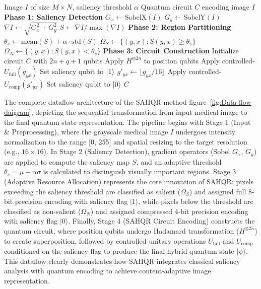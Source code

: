 \documentclass[pdflatex,sn-mathphys-num,Numbered]{sn-jnl}
\theoremstyle{thmstyleone}
\theoremstyle{thmstyletwo}
\theoremstyle{thmstylethree}
\begin{document}
\begin{algorithm}
\caption{SAHQR: Saliency-Aware Hybrid Quantum Image Representation}\label{alg:sahqr}
\begin{algorithmic}[1]
\Require Image $I$ of size $M \times N$, saliency threshold $\alpha$
\Ensure Quantum circuit $C$ encoding image $I$
\State \textbf{Phase 1: Saliency Detection}
\State $G_x \gets \text{SobelX}(I)$ 
\State $G_y \gets \text{SobelY}(I)$ 
\State $\nabla I \gets \sqrt{G_x^2 + G_y^2}$ 
\State $S \gets \nabla I / \max(\nabla I)$ 
\State
\State \textbf{Phase 2: Region Partitioning}
\State $\theta_s \gets \text{mean}(S) + \alpha \cdot \text{std}(S)$ 
\State $\Omega_S \gets \{(y,x) : S(y,x) \geq \theta_s\}$ 
\State $\Omega_N \gets \{(y,x) : S(y,x) < \theta_s\}$ 
\State
\State \textbf{Phase 3: Circuit Construction}
\State Initialize circuit $C$ with $2n + q + 1$ qubits
\State Apply $H^{\otimes 2n}$ to position qubits 
\State
{}
    \State Apply controlled-$U_{\text{full}}(g_{yx})$ 
    \State Set saliency qubit to $\ket{1}$
\EndFor
\State
{}
    \State $g'_{yx} \gets \lfloor g_{yx} / 16 \rfloor$ 
    \State Apply controlled-$U_{\text{comp}}(g'_{yx})$ 
    \State Set saliency qubit to $\ket{0}$
\EndFor
\State
\State \Return $C$
\end{algorithmic}
\end{algorithm}

The complete dataflow architecture of the SAHQR method figure~\ref{fig:Data flow daigram}, depicting the sequential transformation from input medical image to the final quantum state representation. The pipeline begins with Stage 1 (Input & Preprocessing), where the grayscale medical image $I$ undergoes intensity normalization to the range [0, 255] and spatial resizing to the target resolution (e.g., $16 \times 16$). In Stage 2 (Saliency Detection), gradient operators (Sobel $G_x$, $G_y$) are applied to compute the saliency map $S$, and an adaptive threshold $\theta_s = \mu + \alpha\sigma$ is calculated to distinguish visually important regions. Stage 3 (Adaptive Resource Allocation) represents the core innovation of SAHQR: pixels exceeding the saliency threshold are classified as salient ($\Omega_S$) and assigned full 8-bit precision encoding with saliency flag $|1\rangle$, while pixels below the threshold are classified as non-salient ($\Omega_N$) and assigned compressed 4-bit precision encoding with saliency flag $|0\rangle$. Finally, Stage 4 (SAHQR Circuit Encoding) constructs the quantum circuit, where position qubits undergo Hadamard transformation ($H^{\otimes 2n}$) to create superposition, followed by controlled unitary operations $U_{\text{full}}$ and $U_{\text{comp}}$ conditioned on the saliency flag to produce the final hybrid quantum state $|\psi\rangle$. This dataflow clearly demonstrates how SAHQR integrates classical saliency analysis with quantum encoding to achieve content-adaptive image representation.
\end{document}
